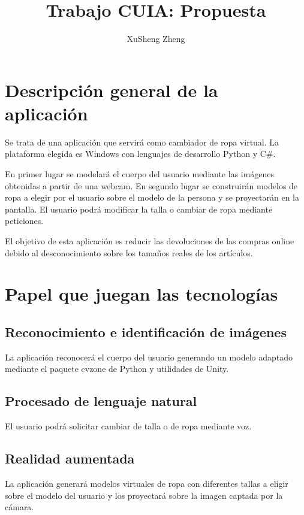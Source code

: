 \documentclass[twoside]{article}
\title{Trabajo CUIA: Propuesta}
\author{XuSheng Zheng}
\date{}
\begin{document}
\maketitle
\section{Descripción general de la aplicación}
Se trata de una aplicación que servirá como cambiador de ropa virtual. La plataforma elegida es Windows con lenguajes de desarrollo Python y C\#.

En primer lugar se modelará el cuerpo del usuario mediante las imágenes obtenidas a partir de una webcam. En segundo lugar se construirán modelos de ropa a elegir por el usuario sobre el modelo de la persona y se proyectarán en la pantalla. El usuario podrá modificar la talla o cambiar de ropa mediante peticiones. 

El objetivo de esta aplicación es reducir las devoluciones de las compras online debido al desconocimiento sobre los tamaños reales de los artículos.

\section{Papel que juegan las tecnologías}
\subsection{Reconocimiento e identificación de imágenes}
La aplicación reconocerá el cuerpo del usuario generando un modelo adaptado mediante el paquete cvzone de Python y utilidades de Unity.
\subsection{Procesado de lenguaje natural}
El usuario podrá solicitar cambiar de talla o de ropa mediante voz.
\subsection{Realidad aumentada}
La aplicación generará modelos virtuales de ropa con diferentes tallas a eligir sobre el modelo del usuario y los proyectará sobre la imagen captada por la cámara.
\end{document}

